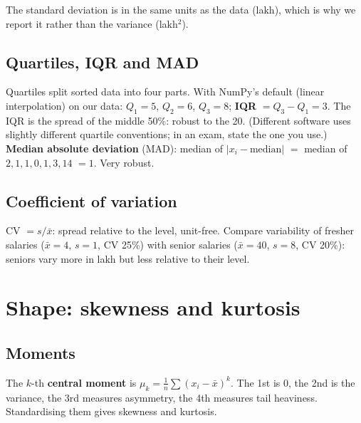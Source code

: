 The standard deviation is in the same units as the data (lakh), which is why we report it rather than the variance (lakh$^2$).

\subsection{Quartiles, IQR and MAD}
Quartiles split sorted data into four parts. With NumPy's default (linear interpolation) on our data: $Q_1 = 5$, $Q_2 = 6$, $Q_3 = 8$; \textbf{IQR} $= Q_3 - Q_1 = 3$.
The IQR is the spread of the middle 50\%: robust to the 20. (Different software uses slightly different quartile conventions; in an exam, state the one you use.)
\textbf{Median absolute deviation} (MAD): median of $|x_i - \text{median}|$ $=$ median of $2,1,1,0,1,3,14$ $= 1$. Very robust.

\subsection{Coefficient of variation}
CV $= s/\bar x$: spread relative to the level, unit-free. Compare variability of fresher salaries ($\bar x = 4$, $s = 1$, CV 25\%) with senior salaries
($\bar x = 40$, $s = 8$, CV 20\%): seniors vary more in lakh but less relative to their level.

\section{Shape: skewness and kurtosis}
\subsection{Moments}
The $k$-th \textbf{central moment} is $\mu_k = \frac1n\sum(x_i - \bar x)^k$. The 1st is 0, the 2nd is the variance, the 3rd measures asymmetry, the 4th measures
tail heaviness. Standardising them gives skewness and kurtosis.

